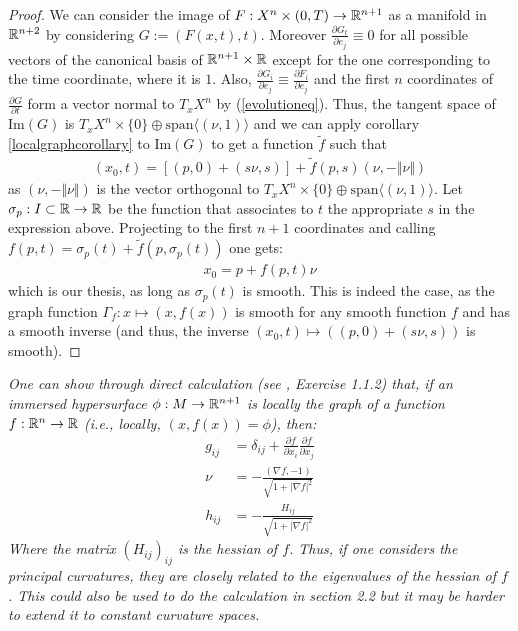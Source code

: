 \begin{proof}
	We can consider the image of $F:X^n\times(0, T)\rightarrow \mathbb{R}^{n+1}$ as a manifold in $\mathbb{R}^{n+2}$ by considering $G:=(F(x, t), t)$. Moreover $\frac{\partial G_t}{\partial e_j}\equiv 0$ for all possible vectors of the canonical basis of $\mathbb{R}^{n+1}\times \mathbb{R}$ except for the one corresponding to the time coordinate, where it is $1$. Also, $\frac{\partial G_i}{\partial e_j}\equiv \frac{\partial F_i}{\partial e_j}$ and the first $n$ coordinates of  $\frac{\partial G}{\partial t}$ form a vector normal to $T_x X^n$ by (\ref{evolutioneq}).  Thus, the tangent space of $\mathrm{Im}(G)$ is $T_x X^n \times \{0\}\oplus  \mathrm{span}\langle (\nu, 1)\rangle$ and we can apply corollary  \ref{localgraphcorollary} to $\mathrm{Im}(G)$ to get a function $\tilde{f}$ such that 
	\begin{align*}
		(x_0, t)= \left[(p, 0) +  (s\nu, s)\right] + \tilde{f}(p, s)(\nu, -\Vert \nu\Vert)
	\end{align*}
	as $(\nu, -\Vert \nu\Vert)$ is the vector orthogonal to  $T_x X^n \times \{0\}\oplus  \mathrm{span}\langle (\nu, 1)\rangle$. Let $\sigma_p:I\subset\mathbb{R}\rightarrow\mathbb{R}$ be the function that associates to $t$ the appropriate $s$ in the expression above.  Projecting to the first $n+1$ coordinates and calling $f(p, t)=\sigma_p(t)+\tilde{f}(p, \sigma_p(t))$ one gets:
	\begin{align*}
		x_0= p + f(p, t)\nu 
	\end{align*}
	which is our thesis, as long as $\sigma_p(t)$ is smooth. This is indeed the case, as the graph function $\Gamma_f:x\mapsto(x, f(x))$ is smooth for any smooth function $f$ and has a smooth inverse (and thus, the inverse $(x_0, t)\mapsto ((p, 0) +  (s\nu, s))$ is smooth).
\end{proof}
\begin{oss}\em
	One can show through direct calculation (see \cite{mantegazza}, Exercise 1.1.2) that, if an immersed hypersurface $\phi : M\rightarrow \mathbb{R}^{n+1}$ is locally the graph of a function $f:\mathbb{R}^n \rightarrow \mathbb{R}$ (i.e., locally, $(x, f(x))=\phi$), then: 
	\begin{align*}
		g_{ij}&=\delta_{ij}+ \frac{\partial f}{\partial x_i} \frac{\partial f}{\partial x_j}\\
		\nu&= -\frac{(\nabla f, -1)}{\sqrt{1+|\nabla f|^2}}\\
		h_{ij}&= -\frac{H_{ij}}{\sqrt{1+|\nabla f|^2}}
	\end{align*}
	Where the matrix $(H_{ij})_{ij}$ is the hessian of $f$. Thus, if one considers the principal curvatures, they are closely related to the eigenvalues of the hessian of $f$. This could also be used to do the calculation in section 2.2 but it may be harder to extend it to constant curvature spaces. 
\end{oss}



